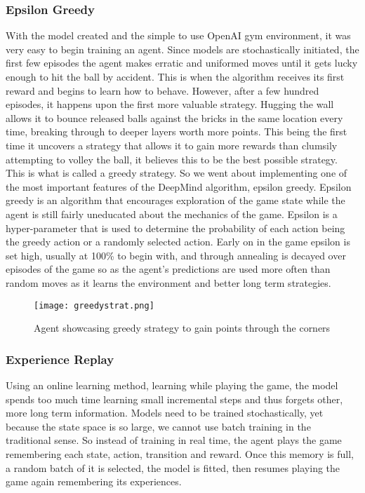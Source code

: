 \documentclass[%
 aip,
 jmp,%
 amsmath,amssymb,
 reprint,%
]{revtex4-1}
\begin{document}
\subsubsection{Epsilon Greedy}
With the model created and the simple to use OpenAI gym environment, it was very easy to begin training an agent. Since models are stochastically initiated, the first few episodes the agent makes erratic and uniformed moves until it gets lucky enough to hit the ball by accident. This is when the algorithm receives its first reward and begins to learn how to behave. However, after a few hundred episodes, it happens upon the first more valuable strategy. Hugging the wall allows it to bounce released balls against the bricks in the same location every time, breaking through to deeper layers worth more points. This being the first time it uncovers a strategy that allows it to gain more rewards than clumsily attempting to volley the ball, it believes this to be the best possible strategy. This is what is called a greedy strategy.
So we went about implementing one of the most important features of the DeepMind algorithm, epsilon greedy. Epsilon greedy is an algorithm that encourages exploration of the game state while the agent is still fairly uneducated about the mechanics of the game. Epsilon is a hyper-parameter that is used to determine the probability of each action being the greedy action or a randomly selected action. Early on in the game epsilon is set high, usually at 100\% to begin with, and through annealing is decayed over episodes of the game so as the agent's predictions are used more often than random moves as it learns the environment and better long term strategies.
\begin{figure}[th]
\texttt{[image: greedystrat.png]}
\caption{Agent showcasing greedy strategy to gain points through the corners}
\label{fig:greedy}
\end{figure}
\FloatBarrier

\subsubsection{Experience Replay}
Using an online learning method, learning while playing the game, the model spends too much time learning small incremental steps and thus forgets other, more long term information. Models need to be trained stochastically, yet because the state space is so large, we cannot use batch training in the traditional sense. So instead of training in real time, the agent plays the game remembering each state, action, transition and reward. Once this memory is full, a random batch of it is selected, the model is fitted, then resumes playing the game again remembering its experiences.
\end{document}
